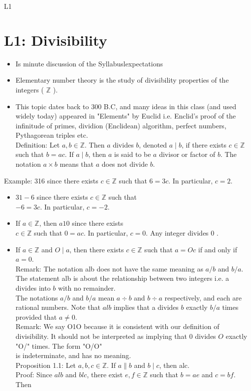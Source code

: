 \documentclass[10pt]{article}
\begin{document}
L1

\section*{L1: Divisibility}
\begin{itemize}
  \item Is minute discussion of the Syllabuslexpectations
  \item Elementary number theory is the study of divisibility properties of the integers ( $\mathbb{Z}$ ).
  \item This topic dates back to 300 B.C, and many ideas in this class (and used widely today) appeared in "Elements" by Euclid i.e. Enclid's proof of the infinitude of primes, dividion (Enclidean) algorithm, perfect numbers, Pythagorean triples etc.\\
Definition: Let $a, b \in \mathbb{Z}$. Then $a$ divides $b$, denoted $a \mid b$, if there exists $c \in \mathbb{Z}$ such that $b=a c$. If $a \mid b$, then $a$ is said to be $a$ divisor or factor of $b$. The notation $a \times b$ means that $a$ does not divide $b$.
\end{itemize}

Example: 316 since there exists $c \in \mathbb{Z}$ such that $6=3 c$. In particular, $c=2$.

\begin{itemize}
  \item $31-6$ since there exists $c \in \mathbb{Z}$ such that\\
$-6=3 c$. In particular, $c=-2$.
  \item If $a \in \mathbb{Z}$, then $a 10$ since there exists\\
$c \in \mathbb{Z}$ such that $0=a c$. In particular, $c=0$. Any integer divides 0 .
  \item If $a \in \mathbb{Z}$ and $O \mid a$, then there exists $c \in \mathbb{Z}$ such that $a=O c$ if and only if $a=0$.\\
Remark: The notation alb does not have the same meaning as $a / b$ and $b / a$. The statement alb is about the relationship between two integers i.e. a divides into $b$ with no remainder.\\
The notations $a / b$ and $b / a$ mean $a \div b$ and $b \div a$ respectively, and each are rational numbers. Note that $a l b$ implies that a divides $b$ exactly $b / a$ times provided that $a \neq 0$.\\
Remark: We say O1O because it is consistent with our definition of divisibility. It should not be interpreted as implying that 0 divides $O$ exactly "O/" times. The form "O/O"\\
is indeterminate, and has no meaning.\\
Proposition 1.1: Let $a, b, c \in \mathbb{Z}$. If $a \| b$ and $b \mid c$, then alc.\\
Proof: Since $a l b$ and $b l c$, there exist $e, f \in \mathbb{Z}$ such that $b=a e$ and $c=b f$. Then
\end{itemize}
\end{document}

